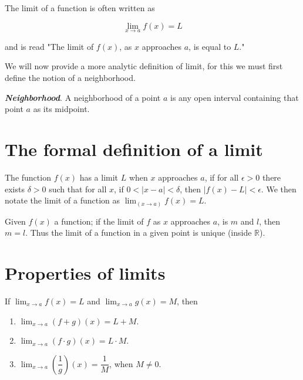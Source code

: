 \documentclass{report}
\begin{document}
The limit of a function is often written as

$$\lim_{x \to a} f(x) = L$$

and is read "The limit of $f(x)$, as $x$ approaches $a$, is equal to $L$."

We will now provide a more analytic definition of limit, for this we must first define the notion of a neighborhood.

\begin{defBox}
    \textit{\textbf{Neighborhood}}. A neighborhood of a point $a$ is any open interval containing that point $a$ as its midpoint.
\end{defBox}



\section{The formal definition of a limit}

\begin{defBox}
    The function $f(x)$ has a limit $L$ when $x$ approaches $a$, if for all $\epsilon > 0$ there exists $\delta > 0$ such that for all $x$, if $0 < |x-a| <\delta$, then $|f(x)-L| < \epsilon$. We then notate the limit of a function as $\lim_(x \to a) f(x) = L$.
\end{defBox}

\begin{thBox}
    Given $f(x)$ a function; if the limit of $f$ as $x$ approaches $a$, is $m$ and $l$, then $m=l$. Thus the limit of a function in a given point is unique (inside $\mathbb{R}$).
\end{thBox}

\section{Properties of limits}

\begin{thBox}
    If $\lim_{x \to a} f(x) = L$ and $\lim_{x \to a} g(x) = M$, then

    \begin{enumerate}
        \item $\lim_{x \to a} (f + g)(x) = L + M$.
        \item $\lim_{x \to a} (f \cdot g)(x) = L \cdot M$.
        \item $\lim_{x \to a} (\dfrac{1}{g})(x) = \dfrac{1}{M}$, when $M \not = 0$.
    \end{enumerate}
\end{thBox}
\end{document}
